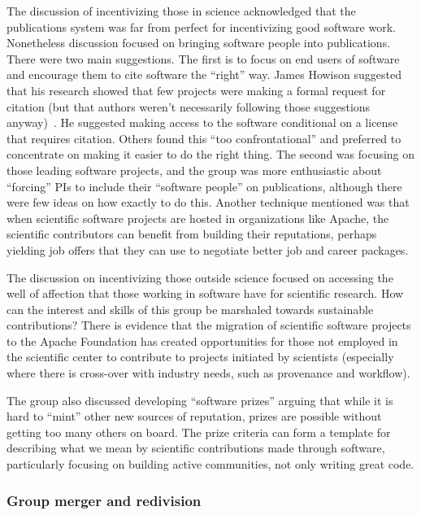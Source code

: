 \documentclass[11pt, oneside]{amsart}
\begin{document}
The discussion of incentivizing those in science acknowledged that the
publications system was far from perfect for incentivizing good software work.
Nonetheless discussion focused on bringing software people into publications.
There were two main suggestions. The first is to focus on end users of software
and encourage them to cite software the ``right'' way. James Howison suggested
that his research showed that few projects were making a formal request for
citation (but that authors weren't necessarily following those suggestions
anyway)~\cite{howison2015jasist}. He suggested making access to the software
conditional on a license that requires citation. Others found this ``too
confrontational'' and preferred to concentrate on making it easier to do the
right thing. The second was focusing on those leading software projects, and the
group was more enthusiastic about ``forcing'' PIs to include their ``software
people'' on publications, although there were few ideas on how exactly to do
this. Another technique mentioned was that when scientific software projects are
hosted in organizations like Apache, the scientific contributors can benefit
from building their reputations, perhaps yielding job offers that they can use
to negotiate better job and career packages.

The discussion on incentivizing those outside science focused on accessing the
well of affection that those working in software have for scientific research.
How can the interest and skills of this group be marshaled towards sustainable
contributions? There is evidence that the migration of scientific software
projects to the Apache Foundation has created opportunities for those not
employed in the scientific center to contribute to projects initiated by
scientists (especially where there is cross-over with industry needs, such as
provenance and workflow).

The group also discussed developing ``software prizes'' arguing that while it is
hard to ``mint'' other new sources of reputation, prizes are possible without
getting too many others on board. The prize criteria can form a template for
describing what we mean by scientific contributions made through software,
particularly focusing on building active communities, not only writing great
code.

\subsubsection{Group merger and redivision}
\end{document}
